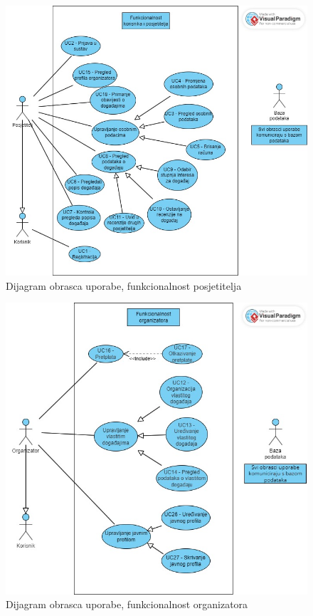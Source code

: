 					\begin{figure}[htbp]
						\centering
						\includegraphics[width=1\textwidth]{dijagrami/obrazac_funkcionalnost_posjetitelja.jpg}
						\caption{Dijagram obrasca uporabe, funkcionalnost posjetitelja}
					\label{fig:my_image}
					\end{figure}
					
					\begin{figure}[htbp]
						\centering
						\includegraphics[width=1\textwidth]{dijagrami/obrazac_funkcionalnost_organizatora.jpg}
						\caption{Dijagram obrasca uporabe, funkcionalnost organizatora}
					\label{fig:my_image}
					\end{figure}

